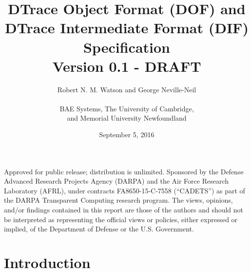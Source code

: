


\title{DTrace Object Format (DOF) and \\
  DTrace Intermediate Format (DIF) \\
  Specification \\
  {\large Version 0.1 - DRAFT}
}

\date{September 5, 2016}

\author{
  Robert N. M. Watson and George Neville-Neil \\
  \\
  BAE Systems, The University of Cambridge, \\
    and Memorial University Newfoundland
}

\begin{minipage}[h]{\textwidth}
  \maketitle

  \vspace{2in}
  {\small
  Approved for public release; distribution is unlimited.
  Sponsored by the Defense Advanced Research Projects Agency (DARPA) and the
  Air Force Research Laboratory (AFRL), under contracts FA8650-15-C-7558
  (``CADETS'') as part of the DARPA Transparent Computing research program.
  The views, opinions, and/or findings contained in this report are those of the
  authors and should not be interpreted as representing the official views or
  policies, either expressed or implied, of the Department of Defense
  or the U.S. Government.}
\end{minipage}

\normalsize



\clearpage



\clearpage



\clearpage

\tableofcontents

\clearpage

\chapter{Introduction}
\label{chap:introduction}


